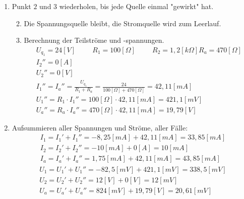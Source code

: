 \begin{enumerate}
    \item Punkt $2$ und $3$ wiederholen, bis jede Quelle einmal "gewirkt" hat.
    \begin{enumerate}
        \setcounter{enumi}{1}
        \item Die Spannungsquelle bleibt, die Stromquelle wird zum Leerlauf.
        \item Berechnung der Teilströme und -spannungen.
        \begin{align}
            U_{q_1} = 24 [V] \hspace{1cm} R_1 = 100 [\Omega] \hspace{1cm} R_2 = 1,2 [k\Omega] R_a = 470 [\Omega] \\
            I_2'' = 0 [A] \\
            U_2'' = 0 [V] \\
            I_1'' = I_a'' = \frac{U_{q_1}}{R_1 + R_a} = \frac{24}{100 [\Omega] + 470 [\Omega]} = 42,11[mA] \\
            U_1'' = R_1 \cdot I_1'' = 100 [\Omega] \cdot 42,11[mA] = 421,1 [mV] \\
            U_a'' = R_a \cdot I_a'' = 470 [\Omega] \cdot 42,11 [mA] = 19,79 [V]
        \end{align}
    \end{enumerate}
    \item Aufsummieren aller Spannungen und Ströme, aller Fälle:
    \begin{align}
        I_1 = I_1' + I_1'' = -8,25[mA] + 42,11[mA] = 33,85[mA] \\
        I_2 = I_2' + I_2'' = -10[mA] + 0[A] = 10[mA] \\
        I_a = I_a' + I_a'' = 1,75[mA] + 42,11[mA] = 43,85[mA]
    \end{align}
    \begin{align}
        U_1 = U_1' + U_1'' = -82,5[mV] + 421,1[mV] = 338,5[mV] \\
        U_2 = U_2' + U_2'' = 12[V] + 0[V] = 12[mV] \\
        U_a = U_a' + U_a'' = 824[mV] + 19,79[V] = 20,61[mV]
    \end{align}
\end{enumerate}